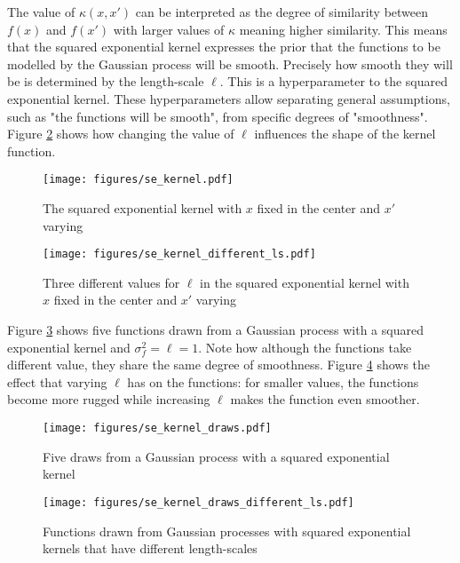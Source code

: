 \documentclass[a4paper,12pt,twoside,openright]{report}
\begin{document}
The value of $\kappa(x, x')$ can be interpreted as the degree of similarity between $f(x)$ and $f(x')$ with larger values of $\kappa$ meaning higher similarity. This means that the squared exponential kernel expresses the prior that the functions to be modelled by the Gaussian process will be smooth. Precisely how smooth they will be is determined by the length-scale $\ell$. This is a hyperparameter to the squared exponential kernel. These hyperparameters allow separating general assumptions, such as "the functions will be smooth", from specific degrees of "smoothness". Figure \ref{sekernel_ls} shows how changing the value of $\ell$ influences the shape of the kernel function.

\begin{figure}
\centering
  \texttt{[image: figures/se\_kernel.pdf]}
  \caption{The squared exponential kernel with $x$ fixed in the center and $x'$ varying}
  \label{sekernel}
\end{figure}

\begin{figure}
\centering
  \texttt{[image: figures/se\_kernel\_different\_ls.pdf]}
  \caption{Three different values for $\ell$ in the squared exponential kernel with $x$ fixed in the center and $x'$ varying}
  \label{sekernel_ls}
\end{figure}

Figure \ref{sekernel_draws} shows five functions drawn from a Gaussian process with a squared exponential kernel and $\sigma_f^2 = \ell = 1$. Note how although the functions take different value, they share the same degree of smoothness. Figure \ref{sekernel_draws_different_ls} shows the effect that varying $\ell$ has on the functions: for smaller values, the functions become more rugged while increasing $\ell$ makes the function even smoother.


\begin{figure}
\centering
  \texttt{[image: figures/se\_kernel\_draws.pdf]}
  \caption{Five draws from a Gaussian process with a squared exponential kernel}
  \label{sekernel_draws}
\end{figure}

\begin{figure}
\centering
  \texttt{[image: figures/se\_kernel\_draws\_different\_ls.pdf]}
  \caption{Functions drawn from Gaussian processes with squared exponential kernels that have different length-scales}
  \label{sekernel_draws_different_ls}
\end{figure}
\end{document}
